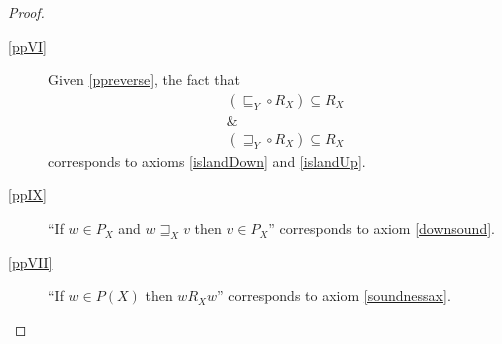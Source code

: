 \begin{proof}
\begin{description}
    \item[\ref{ppVI}] Given \ref{ppreverse}, the fact that
    \begin{eqnarray*}
& (\sqsubseteq_Y \circ R_X) \subseteq R_X \\
& \& \\
&  (\sqsupseteq_Y \circ R_X) \subseteq R_X
\end{eqnarray*}
corresponds to axioms \eqref{islandDown} and \eqref{islandUp}.
    \item[\ref{ppIX}] ``If $w \in P_X$ and $w \sqsupseteq_X
      v$ then $v \in P_X$'' corresponds to axiom \eqref{downsound}.

    \item[\ref{ppVII}] ``If $w \in P (X)$ then $w R_X w$'' corresponds
      to axiom \eqref{soundnessax}.

  \end{description}

\end{proof}
